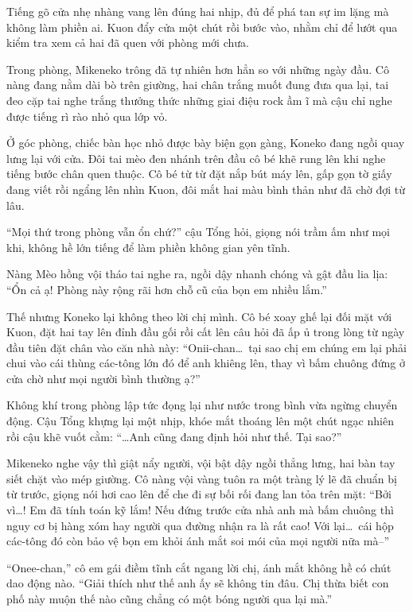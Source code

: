 ﻿\documentclass[../main.tex]{subfiles}
\begin{document}
Tiếng gõ cửa nhẹ nhàng vang lên đúng hai nhịp, đủ để phá tan sự im lặng mà không làm phiền ai. Kuon đẩy cửa một chút rồi bước vào, nhằm chỉ để lướt qua kiểm tra xem cả hai đã quen với phòng mới chưa.

Trong phòng, Mikeneko trông đã tự nhiên hơn hẳn so với những ngày đầu. Cô nàng đang nằm dài bò trên giường, hai chân trắng muốt đung đưa qua lại, tai đeo cặp tai nghe trắng thưởng thức những giai điệu rock ầm ĩ mà cậu chỉ nghe được tiếng rì rào nhỏ qua lớp vỏ.

Ở góc phòng, chiếc bàn học nhỏ được bày biện gọn gàng, Koneko đang ngồi quay lưng lại với cửa. Đôi tai mèo đen nhánh trên đầu cô bé khẽ rung lên khi nghe tiếng bước chân quen thuộc. Cô bé từ từ đặt nắp bút máy lên, gấp gọn tờ giấy đang viết rồi ngẩng lên nhìn Kuon, đôi mắt hai màu bình thản như đã chờ đợi từ lâu.

``Mọi thứ trong phòng vẫn ổn chứ?'' cậu Tổng hỏi, giọng nói trầm ấm như mọi khi, không hề lớn tiếng để làm phiền không gian yên tĩnh.

Nàng Mèo hồng vội tháo tai nghe ra, ngồi dậy nhanh chóng và gật đầu lia lịa: ``Ổn cả ạ! Phòng này rộng rãi hơn chỗ cũ của bọn em nhiều lắm.''

Thế nhưng Koneko lại không theo lời chị mình. Cô bé xoay ghế lại đối mặt với Kuon, đặt hai tay lên đỉnh đầu gối rồi cất lên câu hỏi đã ấp ủ trong lòng từ ngày đầu tiên đặt chân vào căn nhà này: ``Onii-chan\dots\ tại sao chị em chúng em lại phải chui vào cái thùng các-tông lớn đó để anh khiêng lên, thay vì bấm chuông đứng ở cửa chờ như mọi người bình thường ạ?''

Không khí trong phòng lập tức đọng lại như nước trong bình vừa ngừng chuyển động. Cậu Tổng khựng lại một nhịp, khóe mắt thoáng lên một chút ngạc nhiên rồi cậu khẽ vuốt cằm: ``\dots Anh cũng đang định hỏi như thế. Tại sao?''

Mikeneko nghe vậy thì giật nẩy người, vội bật dậy ngồi thẳng lưng, hai bàn tay siết chặt vào mép giường. Cô nàng vội vàng tuôn ra một tràng lý lẽ đã chuẩn bị từ trước, giọng nói hơi cao lên để che đi sự bối rối đang lan tỏa trên mặt: ``Bởi vì\dots! Em đã tính toán kỹ lắm! Nếu đứng trước cửa nhà anh mà bấm chuông thì nguy cơ bị hàng xóm hay người qua đường nhận ra là rất cao! Với lại\dots\ cái hộp các-tông đó còn bảo vệ bọn em khỏi ánh mắt soi mói của mọi người nữa mà--''

``Onee-chan,'' cô em gái điềm tĩnh cắt ngang lời chị, ánh mắt không hề có chút dao động nào. ``Giải thích như thế anh ấy sẽ không tin đâu. Chị thừa biết con phố này muộn thế nào cũng chẳng có một bóng người qua lại mà.''
\end{document}
